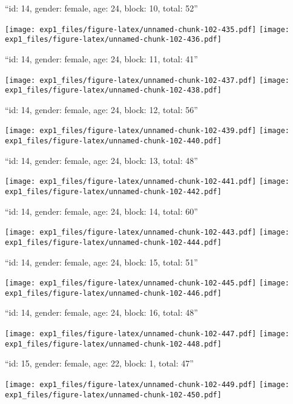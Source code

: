 \documentclass[11pt,,]{article}
\begin{document}
\newpage
[1] 

``id: 14, gender: female, age: 24, block: 10, total: 52''

\texttt{[image: exp1\_files/figure-latex/unnamed-chunk-102-435.pdf]}
\texttt{[image: exp1\_files/figure-latex/unnamed-chunk-102-436.pdf]}

\newpage
[1] 

``id: 14, gender: female, age: 24, block: 11, total: 41''

\texttt{[image: exp1\_files/figure-latex/unnamed-chunk-102-437.pdf]}
\texttt{[image: exp1\_files/figure-latex/unnamed-chunk-102-438.pdf]}

\newpage
[1] 

``id: 14, gender: female, age: 24, block: 12, total: 56''

\texttt{[image: exp1\_files/figure-latex/unnamed-chunk-102-439.pdf]}
\texttt{[image: exp1\_files/figure-latex/unnamed-chunk-102-440.pdf]}

\newpage
[1] 

``id: 14, gender: female, age: 24, block: 13, total: 48''

\texttt{[image: exp1\_files/figure-latex/unnamed-chunk-102-441.pdf]}
\texttt{[image: exp1\_files/figure-latex/unnamed-chunk-102-442.pdf]}

\newpage
[1] 

``id: 14, gender: female, age: 24, block: 14, total: 60''

\texttt{[image: exp1\_files/figure-latex/unnamed-chunk-102-443.pdf]}
\texttt{[image: exp1\_files/figure-latex/unnamed-chunk-102-444.pdf]}

\newpage
[1] 

``id: 14, gender: female, age: 24, block: 15, total: 51''

\texttt{[image: exp1\_files/figure-latex/unnamed-chunk-102-445.pdf]}
\texttt{[image: exp1\_files/figure-latex/unnamed-chunk-102-446.pdf]}

\newpage
[1] 

``id: 14, gender: female, age: 24, block: 16, total: 48''

\texttt{[image: exp1\_files/figure-latex/unnamed-chunk-102-447.pdf]}
\texttt{[image: exp1\_files/figure-latex/unnamed-chunk-102-448.pdf]}

\newpage
[1] 

``id: 15, gender: female, age: 22, block: 1, total: 47''

\texttt{[image: exp1\_files/figure-latex/unnamed-chunk-102-449.pdf]}
\texttt{[image: exp1\_files/figure-latex/unnamed-chunk-102-450.pdf]}
\end{document}
